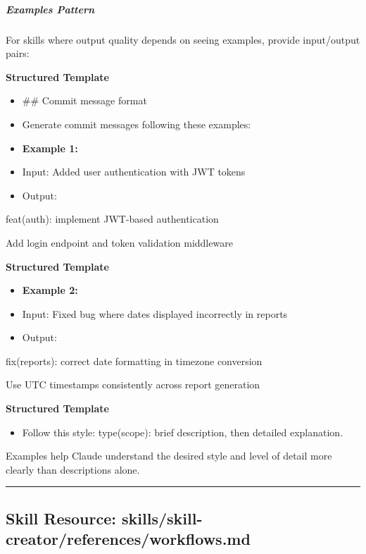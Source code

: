 \documentclass[11pt]{article}
\begin{document}
\subparagraph{Examples Pattern}\mbox{}\par

For skills where output quality depends on seeing examples, provide input/output pairs:


\textbf{Structured Template}
\begin{itemize}[leftmargin=*,itemsep=2pt,topsep=2pt]
\item {} \#\# Commit message format
\item {} Generate commit messages following these examples:
\item {} \textbf{Example 1:}
\item {} Input: Added user authentication with JWT tokens
\item {} Output:
\end{itemize}
feat(auth): implement JWT-based authentication


Add login endpoint and token validation middleware

\textbf{Structured Template}
\begin{itemize}[leftmargin=*,itemsep=2pt,topsep=2pt]
\item {} \textbf{Example 2:}
\item {} Input: Fixed bug where dates displayed incorrectly in reports
\item {} Output:
\end{itemize}
fix(reports): correct date formatting in timezone conversion


Use UTC timestamps consistently across report generation

\textbf{Structured Template}
\begin{itemize}[leftmargin=*,itemsep=2pt,topsep=2pt]
\item {} Follow this style: type(scope): brief description, then detailed explanation.
\end{itemize}

Examples help Claude understand the desired style and level of detail more clearly than descriptions alone.


\vspace{0.8em}\hrule\vspace{0.8em}

\subsection{Skill Resource: skills/skill-creator/references/workflows.md}\label{file:skills-skill-creator-references-workflows-md}
\end{document}
